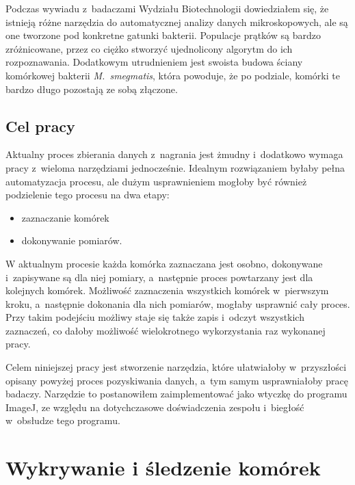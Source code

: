 \documentclass[declaration,shortabstract,mgr]{iithesis}
\begin{document}
Podczas wywiadu z~badaczami Wydziału Biotechnologii dowiedziałem się, że istnieją różne narzędzia do automatycznej analizy danych mikroskopowych, ale są one tworzone pod konkretne gatunki bakterii.
Populacje prątków są bardzo zróżnicowane, przez co ciężko stworzyć ujednolicony algorytm do ich rozpoznawania.
Dodatkowym utrudnieniem jest swoista budowa ściany komórkowej bakterii \emph{M.~smegmatis}, która powoduje, że po podziale, komórki te bardzo długo pozostają ze sobą złączone.

\section{Cel pracy}
\label{sec:target}

Aktualny proces zbierania danych z~nagrania jest żmudny i~dodatkowo wymaga pracy z~wieloma narzędziami jednocześnie.
Idealnym rozwiązaniem byłaby pełna automatyzacja procesu, ale dużym usprawnieniem mogłoby być również podzielenie tego procesu na dwa etapy:
\begin{itemize}
  \item zaznaczanie komórek
  \item dokonywanie pomiarów.
\end{itemize}
W aktualnym procesie każda komórka zaznaczana jest osobno, dokonywane i~zapisywane są dla niej pomiary, a~następnie proces powtarzany jest dla kolejnych komórek.
Możliwość zaznaczenia wszystkich komórek w~pierwszym kroku, a~następnie dokonania dla nich pomiarów, mogłaby usprawnić cały proces.
Przy takim podejściu możliwy staje się także zapis i~odczyt wszystkich zaznaczeń, co dałoby możliwość wielokrotnego wykorzystania raz wykonanej pracy.

Celem niniejszej pracy jest stworzenie narzędzia, które ułatwiałoby w~przyszłości opisany powyżej proces pozyskiwania danych, a~tym samym usprawniałoby pracę badaczy.
Narzędzie to postanowiłem zaimplementować jako wtyczkę do programu ImageJ, ze względu na dotychczasowe doświadczenia zespołu i~biegłość w~obsłudze tego programu.



\chapter{Wykrywanie i śledzenie komórek}
\label{cha:detection-and-tracking}

\end{document}
